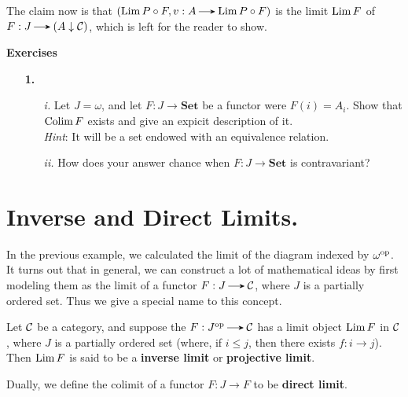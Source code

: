 \begin{example}
\begin{center}
        \end{center}
        The claim now is that $(\Lim P \circ F, v: A \to  \Lim P \circ F)$ 
        is the limit $\operatorname*{\mathrm{Lim }} F$ of $F: J \to (A \downarrow \cc)$, which is left 
        for the reader to show.
    \end{example}

    {\large \textbf{Exercises}
    \vspace{0.2cm}}
    \begin{itemize}
        \item[\textbf{1.}] 
        \begin{itemize}
            \item[\emph{i.}]
            Let $J = \omega$, and let $F: J \to \textbf{Set}$ be a functor 
            were $F(i) = A_i$. Show that $\operatorname*{\mathrm{Colim }} F$ exists and give an expicit 
            description of it. 
            \\
            \emph{Hint}: It will be a set endowed with an equivalence relation.
            
            \item[\emph{ii.}] How does your answer chance when $F: J \to \textbf{Set}$ 
            is contravariant? 
        \end{itemize}
        

    \end{itemize}
    
    \newpage
    \section{Inverse and Direct Limits.}
    In the previous example, we calculated the limit of the diagram
    indexed by $\omega^{\mathrm{op}}$. It turns out that in general, we can construct 
    a lot of mathematical ideas by first modeling them as the limit 
    of a functor $F: J \to \cc$, where $J$ is a partially ordered set.
    Thus we give a special name to this concept.
    
    \begin{definition}
        Let $\mathcal{C}$ be a category, and suppose the $F: J\op \to
        \cc$ has 
        a limit object $\operatorname*{\mathrm{Lim }} F$ in $\mathcal{C}$, where $J$ is a partially
        ordered set (where, if $i \le j$, then there exists $f: i \to
        j$). 
        Then $\operatorname*{\mathrm{Lim }} F$ is
        said to be a \textbf{inverse limit} or \textbf{projective limit}. 
        
        Dually, we define the colimit of a functor $F: J \to F$ 
        to be \textbf{direct limit}. 
    \end{definition}

